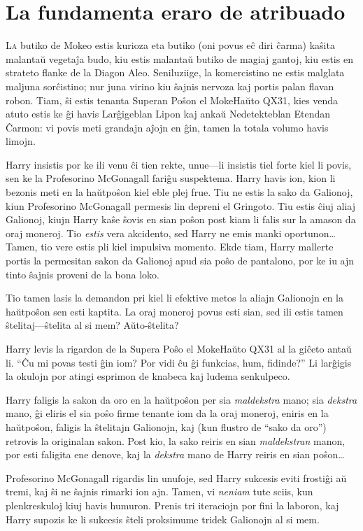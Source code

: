 \chapter{La fundamenta eraro de atribuado}

\lettrine{L}a butiko de Mokeo estis kurioza eta butiko (oni povus eĉ
diri ĉarma) kaŝita malantaŭ vegetaĵa budo, kiu estis malantaŭ butiko
de magiaj gantoj, kiu estis en strateto flanke de la Diagon
Aleo. Seniluziige, la komercistino ne estis malglata maljuna
sorĉistino; nur juna virino kiu ŝajnis nervoza kaj portis palan flavan
robon. Tiam, ŝi estis tenanta Superan Poŝon el MokeHaŭto QX31, kies
venda atuto estis ke ĝi havis Larĝigeblan Lipon kaj ankaŭ
Nedetekteblan Etendan Ĉarmon: vi povis meti grandajn aĵojn en ĝin,
tamen la totala volumo havis limojn.

Harry insistis por ke ili venu ĉi tien rekte, unue—li insistis tiel
forte kiel li povis, sen ke la Profesorino McGonagall fariĝu
suspektema. Harry havis ion, kion li bezonis meti en la haŭtpoŝon kiel
eble plej frue. Tiu ne estis la sako da Galionoj, kiun Profesorino
McGonagall permesis lin depreni el Gringoto. Tiu estis ĉiuj aliaj
Galionoj, kiujn Harry kaŝe ŝovis en sian poŝon post kiam li falis sur
la amason da oraj moneroj. Tio \emph{estis} vera akcidento, sed Harry
ne emis manki oportunon\ldots Tamen, tio vere estis pli kiel impulsiva
momento. Ekde tiam, Harry mallerte portis la permesitan sakon da
Galionoj apud sia poŝo de pantalono, por ke iu ajn tinto ŝajnis
proveni de la bona loko.

Tio tamen lasis la demandon pri kiel li efektive metos la aliajn
Galionojn en la haŭtpoŝon sen esti kaptita. La oraj moneroj povus
esti sian, sed ili estis tamen ŝtelitaj—ŝtelita al si mem?
Aŭto-ŝtelita?

Harry levis la rigardon de la Supera Poŝo el MokeHaŭto QX31 al la
giĉeto antaŭ li.  ``Ĉu mi povas testi ĝin iom? Por vidi ĉu ĝi
funkcias, hum, fidinde?'' Li larĝigis la okulojn por atingi esprimon
de knabeca kaj ludema senkulpeco.

Harry faligis la sakon da oro en la haŭtpoŝon per sia
\emph{maldekstra} mano; sia \emph{dekstra} mano, ĝi eliris el sia poŝo
firme tenante iom da la oraj moneroj, eniris en la haŭtpoŝon, faligis
la ŝtelitajn Galionojn, kaj (kun flustro de ``sako da oro'') retrovis
la originalan sakon. Post kio, la sako reiris en sian
\emph{maldekstran} manon, por esti faligita ene denove, kaj la
\emph{dekstra} mano de Harry reiris en sian poŝon\ldots

Profesorino McGonagall rigardis lin unufoje, sed Harry sukcesis eviti
frostiĝi aŭ tremi, kaj ŝi ne ŝajnis rimarki ion ajn. Tamen, vi
\emph{neniam} tute sciis, kun plenkreskuloj kiuj havis humuron. Prenis
tri iteraciojn por fini la laboron, kaj Harry supozis ke li sukcesis
ŝteli proksimume tridek Galionojn al si mem.

